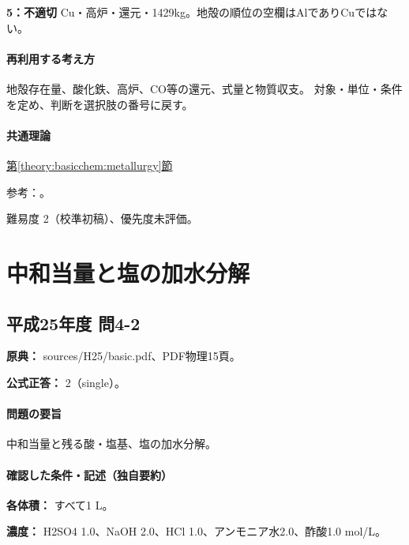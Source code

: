 \noindent\textbf{5：不適切} Cu・高炉・還元・1429kg。地殻の順位の空欄はAlでありCuではない。\par

\paragraph{再利用する考え方} 地殻存在量、酸化鉄、高炉、CO等の還元、式量と物質収支。 対象・単位・条件を定め、判断を選択肢の番号に戻す。

\paragraph{共通理論} \hyperref[theory:basicchem:metallurgy]{第\ref*{theory:basicchem:metallurgy}節}

\par 参考：\cite{chem55_crust,chem55_iron}。

\par 難易度 2（校準初稿）、優先度未評価。

\section{中和当量と塩の加水分解}

\subsection{平成25年度 問4-2}
\label{q:h25-reg-basic-4-2}

\noindent\textbf{原典：} sources/H25/basic.pdf、PDF物理15頁。

\textbf{公式正答：} 2（single）。

\paragraph{問題の要旨} 中和当量と残る酸・塩基、塩の加水分解。

\paragraph{確認した条件・記述（独自要約）}\mbox{}\par

\noindent\textbf{各体積：} すべて1 L。\par

\noindent\textbf{濃度：} H2SO4 1.0、NaOH 2.0、HCl 1.0、アンモニア水2.0、酢酸1.0 mol/L。\par

